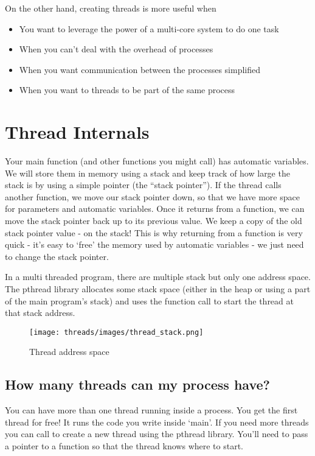 On the other hand, creating threads is more useful when
\begin{itemize}
\tightlist
\item You want to leverage the power of a multi-core system to do one task
\item When you can't deal with the overhead of processes
\item When you want communication between the processes simplified
\item When you want to threads to be part of the same process
\end{itemize}

\section{Thread Internals}

Your main function (and other functions you might call) has automatic variables. We will store them in memory using a stack and keep track of how large the stack is by using a simple pointer (the ``stack pointer''). If the thread calls another function, we move our stack pointer down, so that we have more space for parameters and automatic variables. Once it returns from a function, we can move the stack pointer back up to its previous value. We keep a copy of the old stack pointer value - on the stack! This is why returning from a function is very quick - it's easy to `free' the memory used by automatic variables - we just need to change the stack pointer.

In a multi threaded program, there are multiple stack but only one address space. The pthread library allocates some stack space (either in the heap or using a part of the main program's stack) and uses the  function call to start the thread at that stack address.

\begin{figure}[htbp]
\centering
\texttt{[image: threads/images/thread\_stack.png]}
\caption{Thread address space}
\end{figure}

\subsection{How many threads can my process have?}\label{how-many-threads-can-my-process-have}

You can have more than one thread running inside a process. You get the first thread for free! It runs the code you write inside `main'. If you need more threads you can call  to create a new thread using the pthread library. You'll need to pass a pointer to a function so that the thread knows where to start.

